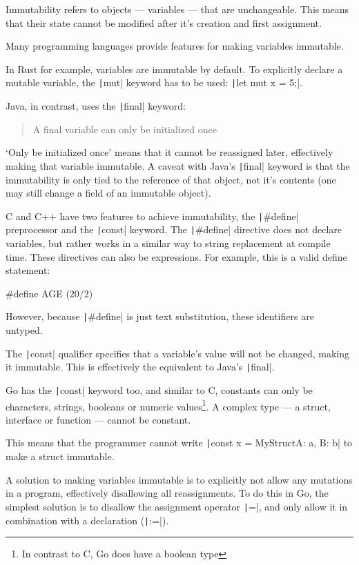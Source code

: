 Immutability refers to objects --- variables --- that are unchangeable. This means
that their state cannot be modified after it's creation and first assignment.

Many programming languages provide features for making variables immutable.

In Rust for example, variables are immutable by default. To explicitly declare
a mutable variable, the \texttt|mut| keyword has to be used: \texttt|let mut x = 5;|.

Java, in contrast, uses the \texttt|final| keyword:
\begin{quote}
    A final variable can only be initialized once\autocite{final-java}
\end{quote}
`Only be initialized once' means that it cannot be reassigned later, effectively
making that variable immutable.
A caveat with Java's \texttt|final| keyword is that the immutability
is only tied to the reference of that object, not
it's contents (one may still change a field of an immutable object).

C and C++ have two features to achieve immutability, the \texttt|#define|
preprocessor and the \texttt|const| keyword.
The \texttt|#define| directive does not declare variables, but rather
works in a similar way to string replacement at compile time. These directives
can also be expressions. For example, this is a valid define statement:
\begin{ccode}
#define AGE (20/2)
\end{ccode}

However, because \texttt|#define| is just text substitution, these
identifiers are untyped.

The \texttt|const| qualifier specifies that a variable's value
will not be changed, making it immutable. This is effectively the equivalent
to Java's \texttt|final|.

Go has the \texttt|const| keyword too, and similar to C, constants can only be
characters, strings, booleans or numeric values\footnote{In contrast to C, Go does
have a boolean type}. A complex type --- a struct, interface or function --- cannot be constant.

This means that the programmer cannot write
\texttt|const x = MyStruct{A: a, B: b}| to make a struct immutable.

A solution to making variables
immutable is to explicitly not allow any mutations in a program, effectively
disallowing all reassignments.
To do this in Go, the simplest solution is
to disallow the assignment operator \texttt|=|, and only
allow it in combination with a declaration (\texttt|:=|).

